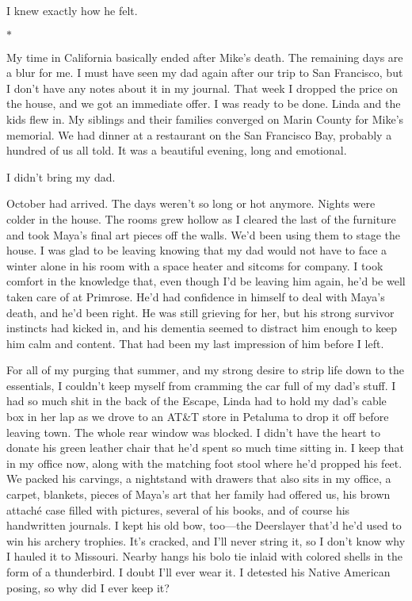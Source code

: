 \documentclass[12pt]{book}
\begin{document}
I knew exactly how he felt.

\begin{center}$*$\end{center}

My time in California basically ended after Mike's death. The remaining days are a blur for me. I must have seen my dad again after our trip to San Francisco, but I don't have any notes about it in my journal. That week I dropped the price on the house, and we got an immediate offer. I was ready to be done. Linda and the kids flew in. My siblings and their families converged on Marin County for Mike's memorial. We had dinner at a restaurant on the San Francisco Bay, probably a hundred of us all told. It was a beautiful evening, long and emotional.

I didn't bring my dad.

October had arrived. The days weren't so long or hot anymore. Nights were colder in the house. The rooms grew hollow as I cleared the last of the furniture and took Maya's final art pieces off the walls. We'd been using them to stage the house. I was glad to be leaving knowing that my dad would not have to face a winter alone in his room with a space heater and sitcoms for company. I took comfort in the knowledge that, even though I'd be leaving him again, he'd be well taken care of at Primrose. He'd had confidence in himself to deal with Maya's death, and he'd been right. He was still grieving for her, but his strong survivor instincts had kicked in, and his dementia seemed to distract him enough to keep him calm and content. That had been my last impression of him before I left.

For all of my purging that summer, and my strong desire to strip life down to the essentials, I couldn't keep myself from cramming the car full of my dad's stuff. I had so much shit in the back of the Escape, Linda had to hold my dad's cable box in her lap as we drove to an AT\&T store in Petaluma to drop it off before leaving town. The whole rear window was blocked. I didn't have the heart to donate his green leather chair that he'd spent so much time sitting in. I keep that in my office now, along with the matching foot stool where he'd propped his feet. We packed his carvings, a nightstand with drawers that also sits in my office, a carpet, blankets, pieces of Maya's art that her family had offered us, his brown attach\'e case filled with pictures, several of his books, and of course his handwritten journals. I kept his old bow, too---the Deerslayer that'd he'd used to win his archery trophies. It's cracked, and I'll never string it, so I don't know why I hauled it to Missouri. Nearby hangs his bolo tie inlaid with colored shells in the form of a thunderbird. I doubt I'll ever wear it. I detested his Native American posing, so why did I ever keep it?
\end{document}
